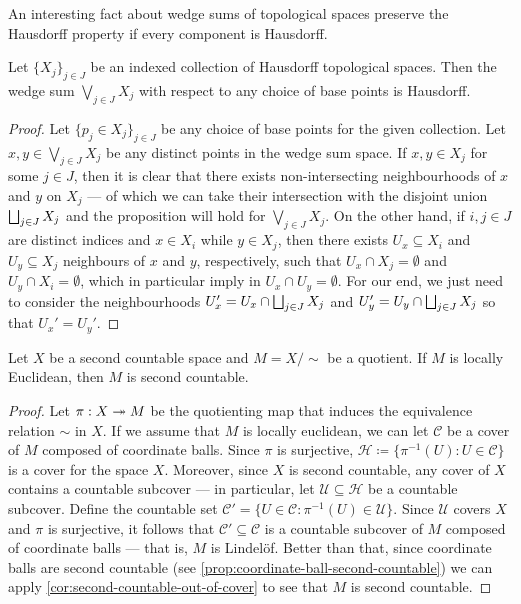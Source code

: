 An interesting fact about wedge sums of topological spaces preserve the
Hausdorff property if every component is Hausdorff.

\begin{proposition}
\label{prop:hausdorff-wedge-sum}
Let \(\{X_{j}\}_{j \in J}\) be an indexed collection of Hausdorff topological
spaces. Then the wedge sum \(\bigvee_{j \in J} X_j\) with respect to any choice
of base points is Hausdorff.
\end{proposition}

\begin{proof}
Let \(\{p_j \in X_j\}_{j \in J}\) be any choice of base points for the given
collection. Let \(x, y \in \bigvee_{j \in J} X_j\) be any distinct points in the
wedge sum space. If \(x, y \in X_j\) for some \(j \in J\), then it is clear that
there exists non-intersecting neighbourhoods of \(x\) and \(y\) on \(X_j\) ---
of which we can take their intersection with the disjoint union \(\bigsqcup_{j \in
J} X_j\) and the proposition will hold for \(\bigvee_{j \in J} X_j\). On the
other hand, if \(i, j \in J\) are distinct indices and \(x \in X_i\) while \(y
\in X_j\), then there exists \(U_x \subseteq X_i\) and \(U_y \subseteq X_j\)
neighbours of \(x\) and \(y\), respectively, such that \(U_x \cap X_j =
\emptyset\) and \(U_y \cap X_i = \emptyset\), which in particular imply in \(U_x
\cap U_y= \emptyset\). For our end, we just need to consider the neighbourhoods
\(U_x' = U_x \cap \bigsqcup_{j \in J} X_j\) and \(U_y' = U_y \cap \bigsqcup_{j \in J}
X_j\) so that \(U_x' = U_y'\).
\end{proof}

\begin{proposition}
\label{prop:quot-second-count-locall-euclidean}
Let \(X\) be a second countable space and \(M = X / {\sim}\) be a quotient. If
\(M\) is locally Euclidean, then \(M\) is second countable.
\end{proposition}

\begin{proof}
Let \(\pi: X \twoheadrightarrow M\) be the quotienting map that induces the equivalence
relation \(\sim\) in \(X\). If we assume that \(M\) is locally euclidean, we can
let \(\mathcal{C}\) be a cover of \(M\) composed of coordinate balls. Since
\(\pi\) is surjective, \(\mathcal H \coloneq \{\pi^{-1}(U): U \in
\mathcal{C}\}\) is a cover for the space \(X\). Moreover, since \(X\) is second
countable, any cover of \(X\) contains a countable subcover --- in particular,
let \(\mathcal U \subseteq \mathcal H\) be a countable subcover. Define the
countable set \(\mathcal{C}' = \{U \in \mathcal{C} : \pi^{-1}(U) \in
\mathcal{U}\}\). Since \(\mathcal{U}\) covers \(X\) and \(\pi\) is surjective,
it follows that \(\mathcal{C}' \subseteq \mathcal{C}\) is a countable subcover
of \(M\) composed of coordinate balls --- that is, \(M\) is Lindelöf. Better
than that, since coordinate balls are second countable (see
\cref{prop:coordinate-ball-second-countable}) we can apply
\cref{cor:second-countable-out-of-cover} to see that \(M\) is second
countable.
\end{proof}

